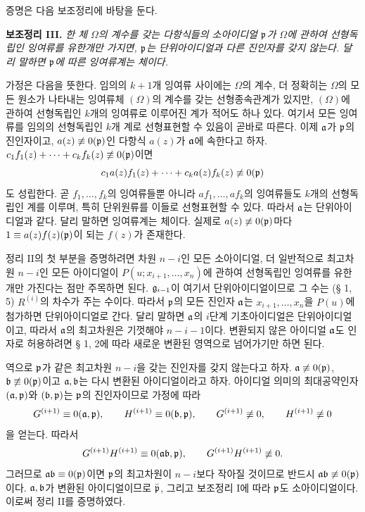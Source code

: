 증명은 다음 보조정리에 바탕을 둔다.

\textbf{보조정리 III.} \emph{한 체 \(\Omega\)의 계수를 갖는 다항식들의 소아이디얼 \(\mathfrak p\)가 \(\Omega\)에 관하여 선형독립인 잉여류를 유한개만 가지면, \(\mathfrak p\)는 단위아이디얼과 다른 진인자를 갖지 않는다. 달리 말하면 \(\mathfrak p\)에 따른 잉여류계는 체이다.}

가정은 다음을 뜻한다. 임의의 \(k+1\)개 잉여류 사이에는 \(\Omega\)의 계수, 더 정확히는 \(\Omega\)의 모든 원소가 나타내는 잉여류체 \((\Omega)\)의 계수를 갖는 선형종속관계가 있지만, \((\Omega)\)에 관하여 선형독립인 \(k\)개의 잉여류로 이루어진 계가 적어도 하나 있다. 여기서 모든 잉여류를 임의의 선형독립인 \(k\)개 계로 선형표현할 수 있음이 곧바로 따른다. 이제 \(\mathfrak a\)가 \(\mathfrak p\)의 진인자이고, \(a(z)\not\equiv0(\mathfrak p)\)인 다항식 \(a(z)\)가 \(\mathfrak a\)에 속한다고 하자. \(c_1f_1(z)+\cdots+c_kf_k(z)\not\equiv0(\mathfrak p)\)이면
\[
 c_1a(z)f_1(z)+\cdots+c_ka(z)f_k(z)\not\equiv0(\mathfrak p)
\]
도 성립한다. 곧 \(f_1,\ldots,f_k\)의 잉여류들뿐 아니라 \(af_1,\ldots,af_k\)의 잉여류들도 \(k\)개의 선형독립인 계를 이루며, 특히 단위원류를 이들로 선형표현할 수 있다. 따라서 \(\mathfrak a\)는 단위아이디얼과 같다. 달리 말하면 잉여류계는 체이다. 실제로 \(a(z)\not\equiv0(\mathfrak p)\)마다 \(1\equiv a(z)f(z)(\mathfrak p)\)이 되는 \(f(z)\)가 존재한다.

정리 II의 첫 부분을 증명하려면 차원 \(n-i\)인 모든 소아이디얼, 더 일반적으로 최고차원 \(n-i\)인 모든 아이디얼이 \(P(u;x_{i+1},\ldots,x_n)\)에 관하여 선형독립인 잉여류를 유한개만 가진다는 점만 주목하면 된다. \(\mathfrak g_{i-1}\)이 여기서 단위아이디얼이므로 그 수는 (§ 1, 5) \(R^{(i)}\)의 차수가 주는 수이다. 따라서 \(\mathfrak p\)의 모든 진인자 \(\mathfrak a\)는 \(x_{i+1},\ldots,x_n\)을 \(P(u)\)에 첨가하면 단위아이디얼로 간다. 달리 말하면 \(\mathfrak a\)의 \(i\)단계 기초아이디얼은 단위아이디얼이고, 따라서 \(\mathfrak a\)의 최고차원은 기껏해야 \(n-i-1\)이다. 변환되지 않은 아이디얼 \(\mathfrak a\)도 인자로 허용하려면 § 1, 2에 따라 새로운 변환된 영역으로 넘어가기만 하면 된다.

역으로 \(\mathfrak p\)가 같은 최고차원 \(n-i\)을 갖는 진인자를 갖지 않는다고 하자. \(\mathfrak a\not\equiv0(\mathfrak p)\), \(\mathfrak b\not\equiv0(\mathfrak p)\)이고 \(\mathfrak a,\mathfrak b\)는 다시 변환된 아이디얼이라고 하자. 아이디얼 의미의 최대공약인자 \((\mathfrak a,\mathfrak p)\)와 \((\mathfrak b,\mathfrak p)\)는 \(\mathfrak p\)의 진인자이므로 가정에 따라
\[
 G^{(i+1)}\equiv0(\mathfrak a,\mathfrak p),\qquad
 H^{(i+1)}\equiv0(\mathfrak b,\mathfrak p),\qquad
 G^{(i+1)}\not\equiv0,\qquad
 H^{(i+1)}\not\equiv0
\]
을 얻는다. 따라서
\[
 G^{(i+1)}H^{(i+1)}\equiv0(\mathfrak a\mathfrak b,\mathfrak p),\qquad
 G^{(i+1)}H^{(i+1)}\not\equiv0.
\]
그러므로 \(\mathfrak a\mathfrak b\equiv0(\mathfrak p)\)이면 \(\mathfrak p\)의 최고차원이 \(n-i\)보다 작아질 것이므로 반드시 \(\mathfrak a\mathfrak b\not\equiv0(\mathfrak p)\)이다. \(\mathfrak a,\mathfrak b\)가 변환된 아이디얼이므로 \(\bar{\mathfrak p}\), 그리고 보조정리 I에 따라 \(\mathfrak p\)도 소아이디얼이다. 이로써 정리 II를 증명하였다.

